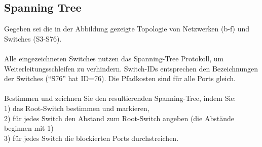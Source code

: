 \documentclass[a4paper]{article}
\begin{document}
\setcounter{section}{6}
\subsection{Spanning Tree}
Gegeben sei die in der Abbildung gezeigte Topologie von Netzwerken (b-f) und Switches (S3-S76).\\\\
Alle eingezeichneten Switches nutzen das Spanning-Tree Protokoll, um Weiterleitungsschleifen zu verhindern. Switch-IDs entsprechen den Bezeichnungen der Switches (“S76” hat ID=76). Die Pfadkosten sind für alle Ports gleich.\\\\
Bestimmen und zeichnen Sie den resultierenden Spanning-Tree, indem Sie:\\
1) das Root-Switch bestimmen und markieren,\\
2) für jedes Switch den Abstand zum Root-Switch angeben (die Abstände beginnen mit 1)\\
3) für jedes Switch die blockierten Ports durchstreichen.\\
\end{document}

